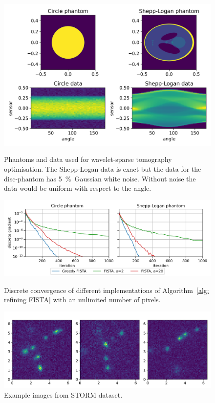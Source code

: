 \documentclass[smallextended]{svjour3}
\newcommand{\1}{\F{1}}
\begin{document}
	\begin{figure}\centering
		\includegraphics[width=.85\textwidth]{haar_data}
		\caption{Phantoms and data used for wavelet-sparse tomography optimisation. The Shepp-Logan data is exact but the data for the disc-phantom has \SI{5}{\percent}\ Gaussian white noise. Without noise the data would be uniform with respect to the angle.}\label{fig: haar data}
		
		\vspace*{\floatsep}
		
		\includegraphics[width=.85\textwidth]{haar_convergence_short}
		\caption{Discrete convergence of different implementations of Algorithm~\ref{alg: refining FISTA} with an unlimited number of pixels.}\label{fig: haar convergence}
		
		\vspace*{\floatsep}
		
		\includegraphics[width=.85\textwidth]{STORM_data}
		\caption{Example images from STORM dataset.}\label{fig: STORM data}
	\end{figure}
	
\end{document}
